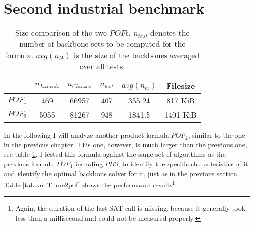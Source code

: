 \section{Second industrial benchmark}

\begin{table} %
\centering
\begin{tabular}{l| c c c c c}
& $n_{Literals}$ & $n_{Clauses}$ & $n_{test}$ & $avg(n_{bb})$ &  Filesize \\
\hline
$POF_1$ & 469 & 66957 & 407 & 355.24 & 817 KiB \\
$POF_2$ & 5055 & 81267 & 948 & 1841.5 & 1401 KiB \\
\end{tabular}
\caption[Size comparison of the two $POF$ formulas. ]{Size comparison of the two $POF$s. 
$n_{test}$ denotes the number of backbone sets to be computed for the formula. $avg(n_{bb})$ is the size of the backbones averaged over all tests.
}
\label{tab:indusComp}
\end{table}

In the following I will analyze another product formula $POF_2$, similar to the one in the previous chapter. This one, however, is much larger than the previous one, see table \ref{tab:indusComp}. I tested this formula against the same set of algorithms as the previous formula $POF_1$ including $PB3$, to identify the specific characteristics of it and identify the optimal backbone solver for it, just as in the previous section. Table \ref{tab:vonThore2pof} shows the performance results\footnote{Again, the duration of the last SAT call is missing, because it generally took less than a millisecond and could not be measured properly.}.


